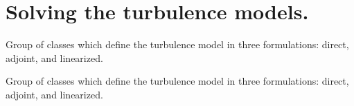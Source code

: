 \hypertarget{group__Turbulence__Model}{}\section{Solving the turbulence models.}
\label{group__Turbulence__Model}


Group of classes which define the turbulence model in three formulations\+: direct, adjoint, and linearized.  


Group of classes which define the turbulence model in three formulations\+: direct, adjoint, and linearized. 

